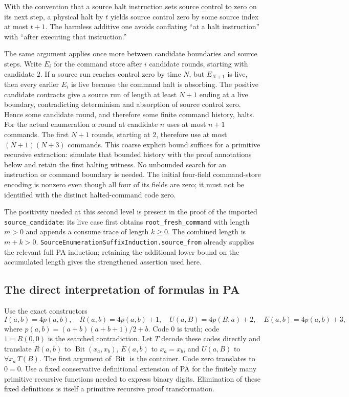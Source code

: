 With the convention that a source halt instruction sets source control
to zero on its next step, a physical halt by $t$ yields source control
zero by some source index at most $t+1$.  The harmless additive one avoids
conflating ``at a halt instruction'' with ``after executing that instruction.''

The same argument applies once more between candidate boundaries and
source steps.  Write $E_i$ for the command store after $i$ candidate rounds,
starting with candidate $2$.  If a source run reaches control zero by
time $N$, but $E_{N+1}$ is live, then every earlier $E_i$ is live because
the command halt is absorbing.  The positive candidate contracts give a
source run of length at least $N+1$ ending at a live boundary, contradicting
determinism and absorption of source control zero.  Hence some candidate
round, and therefore some finite command history, halts.
For the actual enumeration a round at candidate $n$ uses at most $n+1$
commands.  The first $N+1$ rounds, starting at $2$, therefore use at most
$(N+1)(N+3)$ commands.  This coarse explicit bound suffices for a
primitive recursive extraction: simulate that bounded history with the
proof annotations below and retain the first halting witness.  No
unbounded search for an instruction or command boundary is needed.
The initial four-field command-store encoding is nonzero even though
all four of its fields are zero; it must not be identified with the
distinct halted-command code zero.

The positivity needed at this second level is present in the proof of
the imported \texttt{source\_candidate}: its live case first obtains
\texttt{root\_fresh\_command} with length $m>0$ and appends a consume
trace of length $k\geq0$.  The combined length is $m+k>0$.
\nolinkurl{SourceEnumerationSuffixInduction.source_from} already supplies
the relevant full PA induction; retaining the additional lower bound
on the accumulated length gives the strengthened assertion used here.

\subsection{The direct interpretation of formulas in PA}

Use the exact constructors
\[
 I(a,b)=4p(a,b),\quad R(a,b)=4p(a,b)+1,\quad
 U(a,B)=4p(B,a)+2,\quad E(a,b)=4p(a,b)+3,
\]
where $p(a,b)=(a+b)(a+b+1)/2+b$.  Code $0$ is truth; code $1=R(0,0)$
is the searched contradiction.  Let $T$ decode these codes directly and
translate $R(a,b)$ to $\operatorname{Bit}(x_a,x_b)$, $E(a,b)$ to
$x_a=x_b$, and $U(a,B)$ to $\forall x_a\,T(B)$.  The first argument
of $\operatorname{Bit}$ is the container.  Code zero translates to $0=0$.
Use a fixed conservative definitional extension of PA for the finitely
many primitive recursive functions needed to express binary digits.
Elimination of these fixed definitions is itself a primitive recursive
proof transformation.

